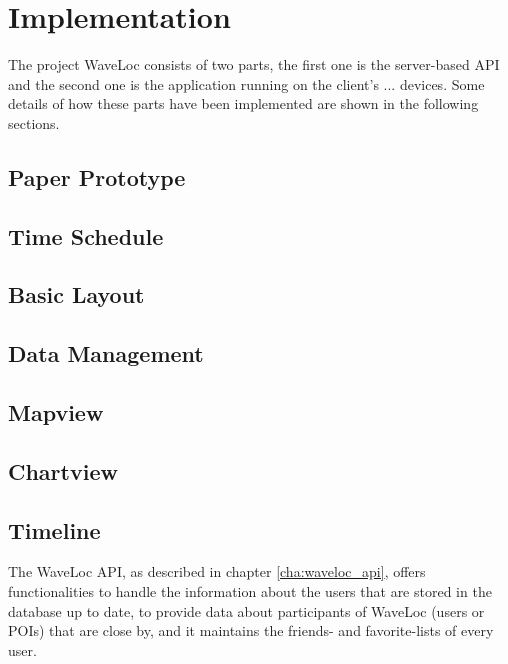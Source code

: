 \chapter{Implementation}
\label{cha:implementation}

The project WaveLoc consists of two parts, the first one is the server-based API and the second one is the application running on the client's ... devices. Some details of how these parts have been implemented are shown in the following sections.


\section{Paper Prototype}
\label{sec:paper_prototype}


\section{Time Schedule}
\label{subsec:time_schedule}

\section{Basic Layout}

\section{Data Management}

\section{Mapview}
\section{Chartview}
\section{Timeline}

The WaveLoc API, as described in chapter \ref{cha:waveloc_api}, offers functionalities to handle the information about the users that are stored in the database up to date, to provide data about participants of WaveLoc (users or POIs) that are close by, and it maintains the friends- and favorite-lists of every user.

